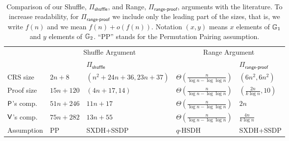 
\begin{table}[h]
\begin{center}
\begin{minipage}{\textwidth}
\begin{center}
\begin{scriptsize}
\begin{tabular}{|l|ll|ll|}
\hline
                                                   & \multicolumn{2}{c|}{Shuffle Argument} & \multicolumn{2}{c|}{Range Argument} \\
                                                   & \cite{AC:GroLu07}          
 & $\Pi_\mathsf{shuffle}$
                                                   & \cite{PAIRING:RiaKohPre09} & $\Pi_{\mathsf{range}\mbox{-}\mathsf{proof}}$ 
\\ \hline\hline
\rule{0pt}{2.5ex}CRS size                          & $2n + 8$                   
              & $(n^2+24n+36,23n+37)$                
                                                   & $\Theta(\frac{n}{\log n-\log\log n})$ & $(6n^2,6n^2)$ \\
\rule{0pt}{2.5ex}Proof size                        & $15n + 120$                
            & $(4n+17,14)$
                                                   & $\Theta(\frac{n}{\log n-\log\log n})$ & $(\frac{2n}{k\log n},10)$ \\
\rule{0pt}{2.5ex}$\mathsf{P}$'s comp.                   & $51n + 246$               
             & $11n+17$
                                                   & $\Theta(\frac{n}{\log n-\log\log n})$ & $2n$ \\
\rule{0pt}{2.5ex}$\mathsf{V}$'s comp.                   & $75n + 282$               
              & $13n+55$
                                                   & $\Theta(\frac{n}{\log n-\log\log n})$ & $\frac{4n}{k\log n}$ \\
\rule{0pt}{2.5ex}Assumption                        & PP                        
                    & SXDH+SSDP
                                                   & $q$-HSDH                   & SXDH+SSDP \\\hline 
\end{tabular}
\end{scriptsize}
\end{center}
\caption{Comparison of our Shuffle, $\Pi_\mathsf{shuffle}$, and Range, $\Pi_{\mathsf{range}\mbox{-}\mathsf{proof}}$, arguments with the literature. To increase readability, for $\Pi_{\mathsf{range}\mbox{-}\mathsf{proof}}$ we include only the leading part of the sizes, that is, we write $f(n)$ and we mean $f(n)+o(f(n))$. Notation $(x,y)$ means $x$ elements of $\mathbb{G}_1$ and $y$ elements of $\mathbb{G}_2$. ``PP'' stands for the Permutation Pairing assumption.
}
\end{minipage}
\end{center}
\end{table}
